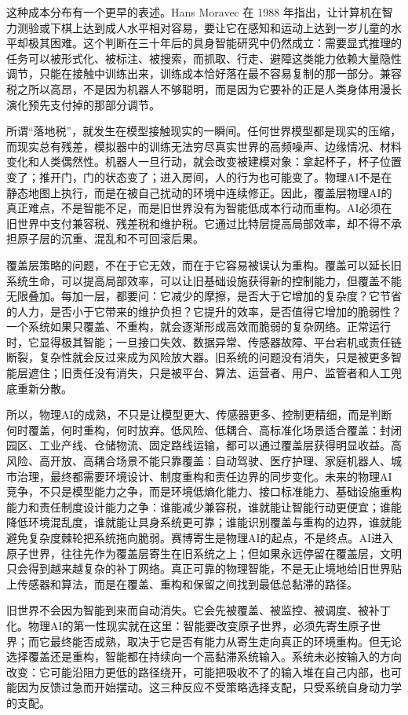 这种成本分布有一个更早的表述。Hans Moravec 在 1988 年指出，让计算机在智力测验或下棋上达到成人水平相对容易，要让它在感知和运动上达到一岁儿童的水平却极其困难\cite{moravec1988}。这个判断在三十年后的具身智能研究中仍然成立：需要显式推理的任务可以被形式化、被标注、被搜索，而抓取、行走、避障这类能力依赖大量隐性调节，只能在接触中训练出来，训练成本恰好落在最不容易复制的那一部分。兼容税之所以高昂，不是因为机器人不够聪明，而是因为它要补的正是人类身体用漫长演化预先支付掉的那部分调节。

所谓“落地税”，就发生在模型接触现实的一瞬间。任何世界模型都是现实的压缩，而现实总有残差，模拟器中的训练无法穷尽真实世界的高频噪声、边缘情况、材料变化和人类偶然性。机器人一旦行动，就会改变被建模对象：拿起杯子，杯子位置变了；推开门，门的状态变了；进入房间，人的行为也可能变了。物理AI不是在静态地图上执行，而是在被自己扰动的环境中连续修正。因此，覆盖层物理AI的真正难点，不是智能不足，而是旧世界没有为智能低成本行动而重构。AI必须在旧世界中支付兼容税、残差税和维护税。它通过比特层提高局部效率，却不得不承担原子层的沉重、混乱和不可回滚后果。


覆盖层策略的问题，不在于它无效，而在于它容易被误认为重构。覆盖可以延长旧系统生命，可以提高局部效率，可以让旧基础设施获得新的控制能力，但覆盖不能无限叠加。每加一层，都要问：它减少的摩擦，是否大于它增加的复杂度？它节省的人力，是否小于它带来的维护负担？它提升的效率，是否值得它增加的脆弱性？一个系统如果只覆盖、不重构，就会逐渐形成高效而脆弱的复杂网络。正常运行时，它显得极其智能；一旦接口失效、数据异常、传感器故障、平台宕机或责任链断裂，复杂性就会反过来成为风险放大器。旧系统的问题没有消失，只是被更多智能层遮住；旧责任没有消失，只是被平台、算法、运营者、用户、监管者和人工兜底重新分散。

所以，物理AI的成熟，不只是让模型更大、传感器更多、控制更精细，而是判断何时覆盖，何时重构，何时放弃。低风险、低耦合、高标准化场景适合覆盖：封闭园区、工业产线、仓储物流、固定路线运输，都可以通过覆盖层获得明显收益。高风险、高开放、高耦合场景不能只靠覆盖：自动驾驶、医疗护理、家庭机器人、城市治理，最终都需要环境设计、制度重构和责任边界的同步变化。未来的物理AI竞争，不只是模型能力之争，而是环境低熵化能力、接口标准能力、基础设施重构能力和责任制度设计能力之争：谁能减少兼容税，谁就能让智能行动更便宜；谁能降低环境混乱度，谁就能让具身系统更可靠；谁能识别覆盖与重构的边界，谁就能避免复杂度棘轮把系统拖向脆弱。赛博寄生是物理AI的起点，不是终点。AI进入原子世界，往往先作为覆盖层寄生在旧系统之上；但如果永远停留在覆盖层，文明只会得到越来越复杂的补丁网络。真正可靠的物理智能，不是无止境地给旧世界贴上传感器和算法，而是在覆盖、重构和保留之间找到最低总黏滞的路径。

旧世界不会因为智能到来而自动消失。它会先被覆盖、被监控、被调度、被补丁化。物理AI的第一性现实就在这里：智能要改变原子世界，必须先寄生原子世界；而它最终能否成熟，取决于它是否有能力从寄生走向真正的环境重构。但无论选择覆盖还是重构，智能都在持续向一个高黏滞系统输入。系统未必按输入的方向改变：它可能沿阻力更低的路径绕开，可能把吸收不了的输入堆在自己内部，也可能因为反馈过急而开始摆动。这三种反应不受策略选择支配，只受系统自身动力学的支配。
